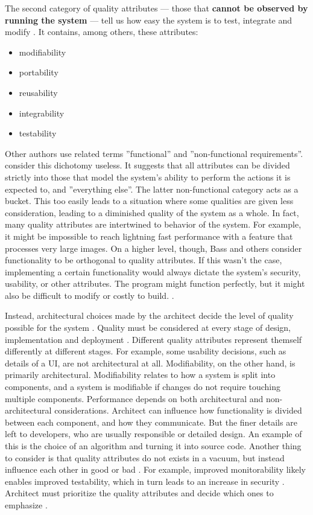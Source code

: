 \documentclass[utf8,english]{gradu3}
\begin{document}
The second category of quality attributes --- those that \textbf{cannot be observed by
  running the system} --- tell us how easy the system is to test, integrate and
modify \parencite[81]{Bass1998}. It contains, among others, these attributes:
\begin{itemize}
  \item modifiability
  \item portability
  \item reusability
  \item integrability
  \item testability
\end{itemize}

Other authors use related terms ''functional'' and ''non-functional requirements''.
\textcite[76]{Bass1998} consider this dichotomy useless. It
suggests that all attributes can be divided strictly into those that model the
system's ability to perform the actions it is expected to, and ''everything
else''. The latter non-functional category acts as a bucket. This too easily
leads to a situation where some qualities are given less consideration, leading
to a diminished quality of the system as a whole. In fact, many quality
attributes are intertwined to behavior of the system. For example, it might be
impossible to reach lightning fast performance with a feature that processes
very large images. On a higher level, though, Bass and others consider functionality
to be orthogonal to quality attributes. If this wasn't the case, implementing a
certain functionality would always dictate the system's security, usability, or
other attributes. The program might function perfectly, but it might
also be difficult to modify or costly to build. \parencite[77]{Bass1998}.

Instead, architectural choices made by the architect decide the level of quality
possible for the system \parencite[72]{Bass2003}. Quality must be considered at every
stage of design, implementation and deployment \parencite{Bass1998}. Different quality
attributes represent themself differently at different stages. For example, some
usability decisions, such as details of a UI, are not architectural at all.
Modifiability, on the other hand, is primarily architectural. Modifiability
relates to how a system is split into components, and a system is modifiable if
changes do not require touching multiple components. Performance depends on both
architectural and non-architectural considerations. Architect can influence how
functionality is divided between each component, and how they communicate. But
the finer details are left to developers, who are usually responsible or
detailed design. An example of this is the choice of an algorithm and turning it
into source code. Another thing to consider is that quality attributes do not
exists in a vacuum, but instead influence each other in good or bad \parencite[78]{Bass1998}.
For example, improved monitorability likely enables improved testability,
which in turn leads to an increase in security \parencite[18]{Li2021}. Architect must
prioritize the quality attributes and decide which ones to emphasize
\parencite[129]{Bass1998}.
\end{document}
